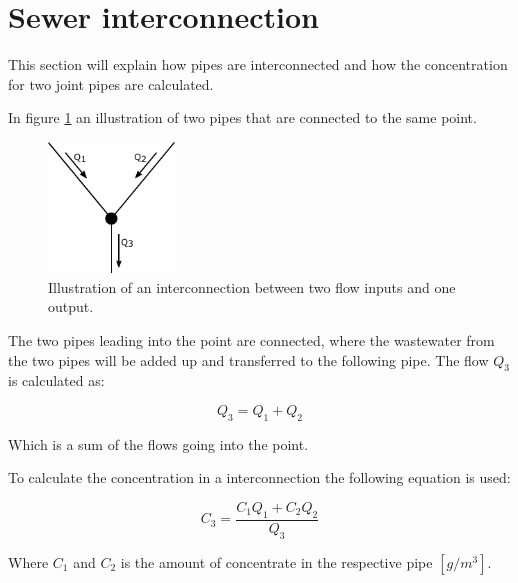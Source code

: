 \section{Sewer interconnection}\label{se:sewer_interconnection}
This section will explain how pipes are interconnected and how the concentration for two joint pipes are calculated.

In figure \ref{fig:interconnections} an illustration of two pipes that are connected to the same point.

\begin{figure}[H]
\centering
\includegraphics[width=0.30\textwidth]{report/modeling/pictures/interconnections}
\caption{Illustration of an interconnection between two flow inputs and one output.}
\label{fig:interconnections}
\end{figure} 

The two pipes leading into the point are connected, where the wastewater from the two pipes will be added up and transferred to the following pipe. The flow $Q_3$ is calculated as:

\begin{equation}
	\boxed{Q_3 = Q_1 + Q_2}
\end{equation} 

Which is a sum of the flows going into the point.

To calculate the concentration in a interconnection the following equation is used: %

\begin{equation}\label{poop_addition_interconnection}
	\boxed{C_3 = \frac{C_1 Q_1 + C_2 Q_2}{Q_3}}
\end{equation}

Where $C_1$ and $C_2$ is the amount of concentrate in the respective pipe $\left[g /m^3 \right]$. 


